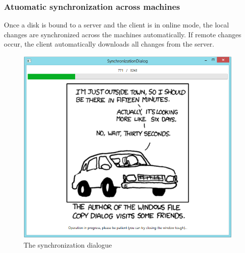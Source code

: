 \documentclass[JCDReport.tex]{subfiles}
\begin{document}
\subsubsection{Atuomatic synchronization across machines}
Once a disk is bound to a server and the client is in online mode, the local changes are synchronized across the machines automatically. If remote changes occur, the client automatically downloads all changes from the server.
\begin{figure}[h!]
	\centering
	\includegraphics[scale=0.7]{imageslukas/synchronization_dialog.png} 
	\caption{The synchronization dialogue}
\end{figure}

\end{document}
